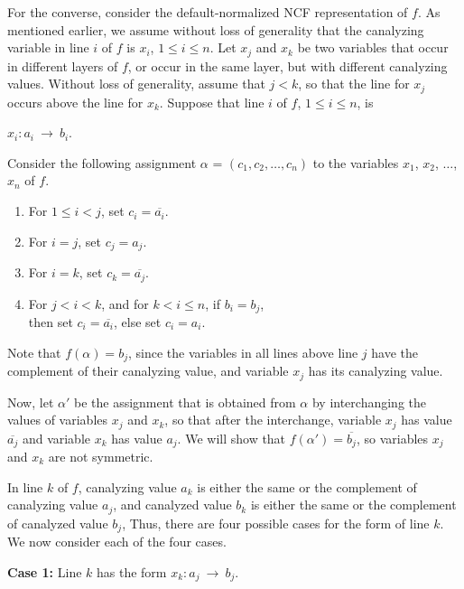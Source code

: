 For the converse, consider the default-normalized NCF representation of $f$. 
As mentioned earlier, we assume without loss of generality that the
canalyzing variable in line $i$ of $f$ is $x_i$, $1 \leq i \leq n$.
Let  $x_j$ and $x_k$ be two variables that occur in different
layers of $f$, or occur in the same layer, but with different
canalyzing values.  Without loss of generality, 
assume that $j < k$, so that the line for
$x_j$ occurs above the line for $x_k$.
Suppose that line $i$ of $f$, $1 \leq i \leq n$, is 

\smallskip

\hspace*{0.25in}
$x_i : a_i ~\longrightarrow~ b_i$. 

\smallskip

\noindent
Consider the following assignment $\alpha$ = $(c_1, c_2, \ldots,  c_n)$ 
to the variables $x_1$, $x_2$, $\ldots$, $x_n$ of $f$.
\begin{enumerate}
\item For $1 \leq i < j$, set $c_i = \overline{a_i}$. 
\item For $i = j$, set $c_j =a_j$. 
\item For $i = k$, set $c_k =\overline{a_j}$. 
\item For $j < i < k$, and for  $k < i \leq n$, 
if $b_i = b_j$,\\ then set $c_i =  \overline{a_i}$,
else set $c_i =  a_i$.
\end{enumerate}
Note that $f(\alpha) = b_j$, since the variables in all lines above
line $j$ have the complement of their canalyzing value, and variable
$x_j$ has its canalyzing value.

\medskip

Now, let $\alpha'$ be the assignment that is obtained from $\alpha$
by interchanging the values of variables $x_j$ and $x_k$, so that
after the interchange, variable $x_j$ has value $\overline{a_j}$ and
variable $x_k$ has value $a_j$.  We will show that $f(\alpha') =
\overline{b_j}$, so variables $x_j$ and $x_k$ are not symmetric.

In line $k$ of $f$, canalyzing value $a_k$ is either the same or
the complement of canalyzing value $a_j$, and canalyzed value $b_k$
is either the same or the complement of canalyzed value $b_j$,
Thus, there are four possible cases for the form of line $k$.  We
now consider each of the four cases.

\medskip

\noindent
{\bf Case 1:} Line $k$ has the form $x_k : a_j ~\longrightarrow~ b_j$.  

